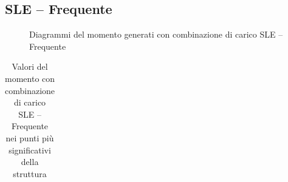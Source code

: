 \clearpage	
\begin{landscape}
\subsection*{SLE -- Frequente}
\begin{figure}[H]
\centering
{} 
\caption{Diagrammi del momento generati con combinazione di carico SLE -- Frequente}
\label{fig:Momenti_SLSfrequent}
\end{figure}
\begin{table}[H]
\centering
\caption{Valori del momento con combinazione di carico SLE -- Frequente nei punti più significativi della struttura}
	\begin{tabular}{lS[table-format=3.2]S[table-format=3.2]S[table-format=3.2]S[table-format=3.2]S[table-format=3.2]S[table-format=3.2]S[table-format=3.2]S[table-format=3.2]S[table-format=3.2]S[table-format=3.2]S[table-format=3.2]S[table-format=3.2]S[table-format=3.2]}

\end{tabular}
\end{table}
\end{landscape}
